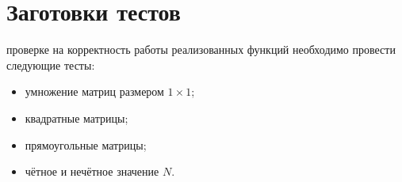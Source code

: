 \section{Заготовки тестов}
 проверке на корректность работы реализованных функций необходимо провести следующие тесты:
\begin{itemize}
	\item умножение матриц размером $1 \times 1$;
	\item квадратные матрицы;
	\item прямоугольные матрицы;
	\item чётное и нечётное значение $N$.
\end{itemize}